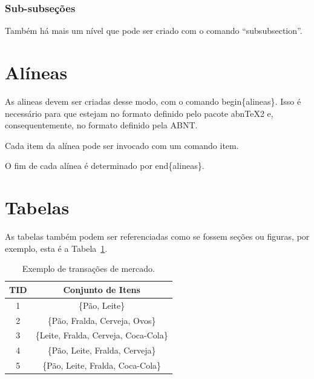 \subsubsection{Sub-subseções}
\label{sss.subsubsecao}

Também há mais um nível que pode ser criado com o comando ``subsubsection''.

\section{Alíneas}
\label{s.alineas}

\begin{alineas}

\item As alineas devem ser criadas desse modo, com o comando begin\{alineas\}. Isso é necessário para que estejam no formato definido pelo pacote abnTeX2 e, consequentemente, no formato definido pela ABNT.

\item Cada item da alínea pode ser invocado com um comando item.

\item O fim de cada alínea é determinado por end\{alineas\}.

\end{alineas}

\section{Tabelas}
\label{s.tabelas}

As tabelas também podem ser referenciadas como se fossem seções ou figuras, por exemplo, esta é a Tabela~\ref{t.transacao_mercado}.

\begin{table}[h]
\centering
\begin{tabular}{c|c}
\hline
\textbf{\small TID} & \textbf{\small Conjunto de Itens}\\\hline \hline
{\small 1} & {\small \{Pão, Leite\}}\\\hline
{\small 2} & {\small \{Pão, Fralda, Cerveja, Ovos\}}\\\hline
{\small 3} & {\small \{Leite, Fralda, Cerveja, Coca-Cola\}}\\\hline
{\small 4} & {\small \{Pão, Leite, Fralda, Cerveja\}}\\\hline
{\small 5} & {\small \{Pão, Leite, Fralda, Coca-Cola\}}\\\hline
\end{tabular}
\caption{Exemplo de transações de mercado.}
\label{t.transacao_mercado}
\end{table}


